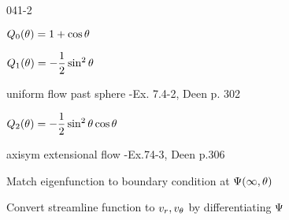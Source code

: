 \begin{mitframe}{041-2}
\begin{listone}
\begin{listtwo}
\begin{listthree}
                            \item $\heatflow_0(\theta)=1+\cos\theta$
                            
                            \item $\heatflow_1(\theta)=-\dfrac{1}{2}\sin^2\theta$
                            
                            			\begin{listfour}
                                        \item uniform flow past sphere -Ex. 7.4-2, Deen p. 302
                                        \end{listfour}
                                
                                \item $\heatflow_2(\theta)=-\dfrac{1}{2}\sin^2\theta\cos\theta$
                                
                                		\begin{listfour}
                                        \item axisym extensional flow -Ex.74-3, Deen p.306
                                        \end{listfour}
								
                               \end{listthree}
                
                \item  Match eigenfunction to boundary condition at $\streamfunc(\infty,\theta)$
                
                \end{listtwo}
                
\item Convert streamline function to $\vvel_{\pos}, \vvel_{\theta}$ by differentiating $\streamfunc$
\end{listone}
\end{mitframe}